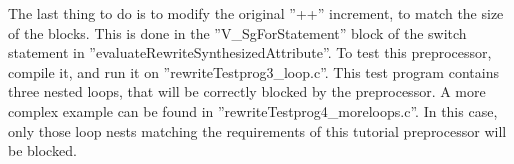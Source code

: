 The last thing to do is to modify the original ''++'' increment, to match the
size of the blocks. This is done in the ''V\_SgForStatement'' block of
the switch statement in ''evaluateRewriteSynthesizedAttribute''. To test this preprocessor,
compile it, and run it on ''rewriteTestprog3\_loop.c''. This test program contains
three nested loops, that will be correctly blocked by the preprocessor. A
more complex example can be found in ''rewriteTestprog4\_moreloops.c''. In this case,
only those loop nests matching the requirements of this tutorial preprocessor
will be blocked.

